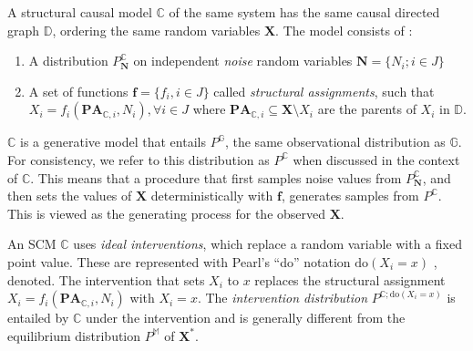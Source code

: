 \documentclass{article}
\begin{document}
 A structural causal model $\mathbb{C}$ of the same system has the same causal directed graph $\mathbb{D}$, ordering the same random variables $\mathbf{X}$. The model consists of \cite{pearl2009causal, peters2017elements}:
\vspace{-3mm}
\begin{enumerate}
\item A distribution $P_{\mathbf{N}}^{\mathbb{C}}$ on independent \emph{noise} random variables $\mathbf{N} = \{N_i; i \in J \}$ \vspace{-3mm}
\item A set of functions $\mathbf{f}=\{f_i, i \in J\}$ called \emph{structural assignments}, such that\\
$X_i = f_i(\mathbf{PA}_{\mathbb{C}, i}, N_i), \forall i \in J$
where $\mathbf{PA}_{\mathbb{C}, i} \subseteq \mathbf{X} \setminus X_i$ are the parents of $X_i$ in $\mathbb{D}$.
\end{enumerate}
$\mathbb{C}$ is a generative model that entails $P^{\mathbb{G}}$, the same observational distribution as $\mathbb{G}$.  For consistency, we refer to this distribution as $P^{\mathbb{C}}$ when discussed in the context of $\mathbb{C}$.   This means that a procedure that first samples noise values from $P_{\mathbf{N}}^{\mathbb{C}}$, and then sets the values of $\mathbf{X}$ deterministically with $\mathbf{f}$, generates samples from $P^{\mathbb{C}}$. This is viewed as the generating process for the observed $\mathbf{X}$.

 An SCM $\mathbb{C}$ uses {\it ideal interventions}, which replace a random variable with a fixed point value. These are represented with Pearl's ``do'' notation $\text{do}(X_i = x)$ \cite{doi:10.1086/525638, pearl2019interpretation}, denoted. The intervention that sets $X_i$ to $x$ replaces the structural assignment $X_i = f_i(\mathbf{PA}_{\mathbb{C}, i}, N_i)$ with $X_i = x$.  The \emph{intervention distribution} $P^{\mathbb{C}; \text{do}(X_i = x)}$ is entailed by $\mathbb{C}$ under the intervention and is generally different from the equilibrium distribution $P^{\mathbb{M}}$ of $\mathbf{X}^*$.
\end{document}
